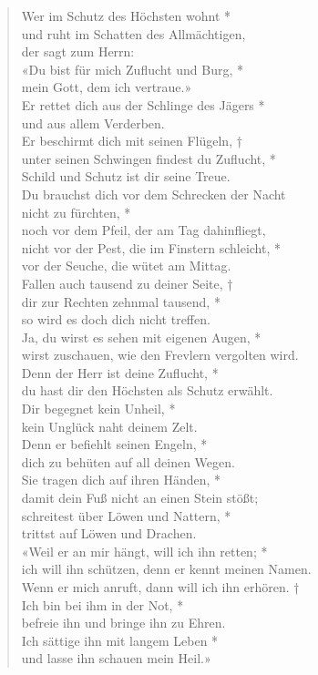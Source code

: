 \begin{verse}
 


Wer im Schutz des Höchsten wohnt *\\ 
und ruht im Schatten des Allmächtigen,\\
\vin der sagt zum Herrn: \\ \vin «Du bist für mich Zuflucht und Burg, *\\
\vin mein Gott, dem ich vertraue.»\\
Er rettet dich aus der Schlinge des Jägers *\\
und aus allem Verderben.\\
\vin Er beschirmt dich mit seinen Flügeln, †\\
\vin unter seinen Schwingen findest du Zuflucht, *\\
\vin Schild und Schutz ist dir seine Treue.\\
Du brauchst dich vor dem Schrecken der Nacht\\ nicht zu fürchten, *\\
noch vor dem Pfeil, der am Tag dahinfliegt,\\
\vin nicht vor der Pest, die im Finstern schleicht, *\\
\vin vor der Seuche, die wütet am Mittag.\\
Fallen auch tausend zu deiner Seite, †\\
dir zur Rechten zehnmal tausend, *\\
so wird es doch dich nicht treffen.\\
\vin Ja, du wirst es sehen mit eigenen Augen, *\\
\vin wirst zuschauen, wie den Frevlern vergolten wird.\\
Denn der Herr ist deine Zuflucht, *\\
du hast dir den Höchsten als Schutz erwählt.\\
\vin Dir begegnet kein Unheil, *\\
\vin kein Unglück naht deinem Zelt.\\
Denn er befiehlt seinen Engeln, *\\
 dich zu behüten auf all deinen Wegen.\\
\vin Sie tragen dich auf ihren Händen, *\\
\vin damit dein Fuß nicht an einen Stein stößt;\\
 schreitest über Löwen und Nattern, *\\
trittst auf Löwen und Drachen.\\
\vin «Weil er an mir hängt, will ich ihn retten; *\\
\vin ich will ihn schützen, denn er kennt meinen Namen.\\
 Wenn er mich anruft, dann will ich ihn erhören. †\\
 Ich bin bei ihm in der Not, *\\
befreie ihn und bringe ihn zu Ehren.\\
\vin Ich sättige ihn mit langem Leben *\\
\vin  und lasse ihn schauen mein Heil.»\\


\end{verse}

